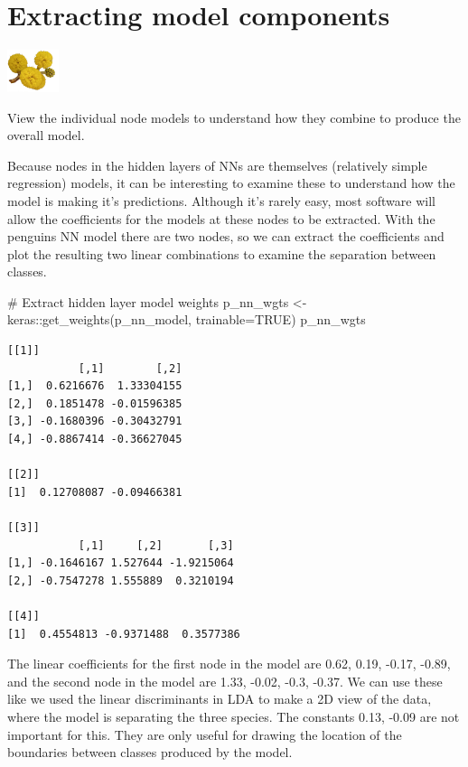 \documentclass[
  letterpaper,
]{krantz}
\newenvironment{Shaded}{\begin{snugshade}}{\end{snugshade}}
\newcommand{\AttributeTok}[1]{\textcolor[rgb]{0.40,0.45,0.13}{#1}}
\newcommand{\CommentTok}[1]{\textcolor[rgb]{0.37,0.37,0.37}{#1}}
\newcommand{\ConstantTok}[1]{\textcolor[rgb]{0.56,0.35,0.01}{#1}}
\newcommand{\FunctionTok}[1]{\textcolor[rgb]{0.28,0.35,0.67}{#1}}
\newcommand{\NormalTok}[1]{\textcolor[rgb]{0.00,0.23,0.31}{#1}}
\newcommand{\OtherTok}[1]{\textcolor[rgb]{0.00,0.23,0.31}{#1}}
\newcommand{\SpecialCharTok}[1]{\textcolor[rgb]{0.37,0.37,0.37}{#1}}
\newcommand{\infobox}[1]{%
\noindent\colorbox{info!30}{%
\begin{minipage}{0.98\linewidth}%
    \centering%
    \begin{minipage}[c]{0.15\linewidth} %
      \includegraphics[width=1.5cm]{images/mulga-flowers2.png} %
    \end{minipage}%
    \hfill %
    \begin{minipage}[c]{0.8\linewidth} %
      \bigskip%
      \textsf{#1}%
      \bigskip%
    \end{minipage}%
    \hspace*{3mm}%
  \end{minipage}%
}%
}
\begin{document}
\section{Extracting model components}\label{extracting-model-components}


\infobox{View the individual node models to understand how they combine to produce the overall model.
}

Because nodes in the hidden layers of NNs are themselves (relatively
simple regression) models, it can be interesting to examine these to
understand how the model is making it's predictions. Although it's
rarely easy, most software will allow the coefficients for the models at
these nodes to be extracted. With the penguins NN model there are two
nodes, so we can extract the coefficients and plot the resulting two
linear combinations to examine the separation between classes.

\begin{Shaded}
\begin{Highlighting}[]
\CommentTok{\# Extract hidden layer model weights}
\NormalTok{p\_nn\_wgts }\OtherTok{\textless{}{-}}\NormalTok{ keras}\SpecialCharTok{::}\FunctionTok{get\_weights}\NormalTok{(p\_nn\_model, }\AttributeTok{trainable=}\ConstantTok{TRUE}\NormalTok{)}
\NormalTok{p\_nn\_wgts }
\end{Highlighting}
\end{Shaded}

\begin{verbatim}
[[1]]
           [,1]        [,2]
[1,]  0.6216676  1.33304155
[2,]  0.1851478 -0.01596385
[3,] -0.1680396 -0.30432791
[4,] -0.8867414 -0.36627045

[[2]]
[1]  0.12708087 -0.09466381

[[3]]
           [,1]     [,2]       [,3]
[1,] -0.1646167 1.527644 -1.9215064
[2,] -0.7547278 1.555889  0.3210194

[[4]]
[1]  0.4554813 -0.9371488  0.3577386
\end{verbatim}

The linear coefficients for the first node in the model are 0.62, 0.19,
-0.17, -0.89, and the second node in the model are 1.33, -0.02, -0.3,
-0.37. We can use these like we used the linear discriminants in LDA to
make a 2D view of the data, where the model is separating the three
species. The constants 0.13, -0.09 are not important for this. They are
only useful for drawing the location of the boundaries between classes
produced by the model.
\end{document}

